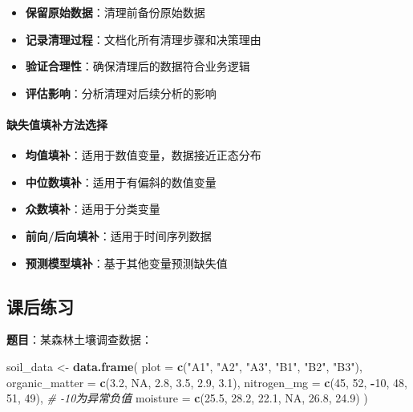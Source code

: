 \documentclass[
]{book}
\newenvironment{Shaded}{\begin{snugshade}}{\end{snugshade}}
\newcommand{\AttributeTok}[1]{\textcolor[rgb]{0.13,0.29,0.53}{#1}}
\newcommand{\CommentTok}[1]{\textcolor[rgb]{0.56,0.35,0.01}{\textit{#1}}}
\newcommand{\ConstantTok}[1]{\textcolor[rgb]{0.56,0.35,0.01}{#1}}
\newcommand{\DecValTok}[1]{\textcolor[rgb]{0.00,0.00,0.81}{#1}}
\newcommand{\FloatTok}[1]{\textcolor[rgb]{0.00,0.00,0.81}{#1}}
\newcommand{\FunctionTok}[1]{\textcolor[rgb]{0.13,0.29,0.53}{\textbf{#1}}}
\newcommand{\NormalTok}[1]{#1}
\newcommand{\OtherTok}[1]{\textcolor[rgb]{0.56,0.35,0.01}{#1}}
\newcommand{\SpecialCharTok}[1]{\textcolor[rgb]{0.81,0.36,0.00}{\textbf{#1}}}
\newcommand{\StringTok}[1]{\textcolor[rgb]{0.31,0.60,0.02}{#1}}
\providecommand{\tightlist}{%
  \setlength{\itemsep}{0pt}\setlength{\parskip}{0pt}}
\begin{document}
\begin{itemize}
\tightlist
\item
  \textbf{保留原始数据}：清理前备份原始数据
\item
  \textbf{记录清理过程}：文档化所有清理步骤和决策理由
\item
  \textbf{验证合理性}：确保清理后的数据符合业务逻辑
\item
  \textbf{评估影响}：分析清理对后续分析的影响
\end{itemize}

\hypertarget{ux7f3aux5931ux503cux586bux8865ux65b9ux6cd5ux9009ux62e9}{%
\paragraph{缺失值填补方法选择}\label{ux7f3aux5931ux503cux586bux8865ux65b9ux6cd5ux9009ux62e9}}

\begin{itemize}
\tightlist
\item
  \textbf{均值填补}：适用于数值变量，数据接近正态分布
\item
  \textbf{中位数填补}：适用于有偏斜的数值变量
\item
  \textbf{众数填补}：适用于分类变量
\item
  \textbf{前向/后向填补}：适用于时间序列数据
\item
  \textbf{预测模型填补}：基于其他变量预测缺失值
\end{itemize}

\hypertarget{ux8bfeux540eux7ec3ux4e60-5}{%
\subsection{课后练习}\label{ux8bfeux540eux7ec3ux4e60-5}}

\textbf{题目}：某森林土壤调查数据：

\begin{Shaded}
\begin{Highlighting}[]
\NormalTok{soil\_data }\OtherTok{\textless{}{-}} \FunctionTok{data.frame}\NormalTok{(}
  \AttributeTok{plot =} \FunctionTok{c}\NormalTok{(}\StringTok{"A1"}\NormalTok{, }\StringTok{"A2"}\NormalTok{, }\StringTok{"A3"}\NormalTok{, }\StringTok{"B1"}\NormalTok{, }\StringTok{"B2"}\NormalTok{, }\StringTok{"B3"}\NormalTok{),}
  \AttributeTok{organic\_matter =} \FunctionTok{c}\NormalTok{(}\FloatTok{3.2}\NormalTok{, }\ConstantTok{NA}\NormalTok{, }\FloatTok{2.8}\NormalTok{, }\FloatTok{3.5}\NormalTok{, }\FloatTok{2.9}\NormalTok{, }\FloatTok{3.1}\NormalTok{),}
  \AttributeTok{nitrogen\_mg =} \FunctionTok{c}\NormalTok{(}\DecValTok{45}\NormalTok{, }\DecValTok{52}\NormalTok{, }\SpecialCharTok{{-}}\DecValTok{10}\NormalTok{, }\DecValTok{48}\NormalTok{, }\DecValTok{51}\NormalTok{, }\DecValTok{49}\NormalTok{),  }\CommentTok{\# {-}10为异常负值}
  \AttributeTok{moisture =} \FunctionTok{c}\NormalTok{(}\FloatTok{25.5}\NormalTok{, }\FloatTok{28.2}\NormalTok{, }\FloatTok{22.1}\NormalTok{, }\ConstantTok{NA}\NormalTok{, }\FloatTok{26.8}\NormalTok{, }\FloatTok{24.9}\NormalTok{)}
\NormalTok{)}
\end{Highlighting}
\end{Shaded}
\end{document}
